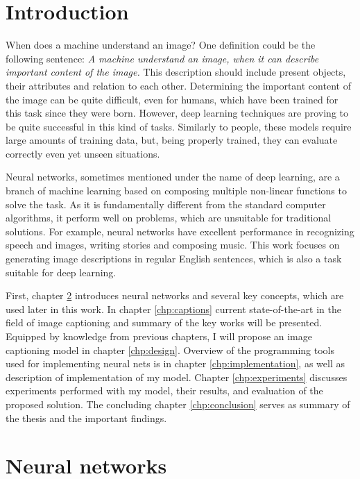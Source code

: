
\chapter{Introduction}

When does a machine understand an image? One definition could be the following sentence: \emph{A machine understand an image, when it can describe important content of the image.} This description should include present objects, their attributes and relation to each other. Determining the important content of the image can be quite difficult, even for humans, which have been trained for this task since they were born. However, deep learning techniques are proving to be quite successful in this kind of tasks. Similarly to people, these models require large amounts of training data, but, being properly trained, they can evaluate correctly even yet unseen situations.

Neural networks, sometimes mentioned under the name of deep learning, are a branch of machine learning based on composing multiple non-linear functions to solve the task. As it is fundamentally different from the standard computer algorithms, it perform well on problems, which are unsuitable for traditional solutions. For example, neural networks have excellent performance in recognizing speech and images, writing stories and composing music. This work focuses on generating image descriptions in regular English sentences, which is also a task suitable for deep learning.

First, chapter \ref{chp:nn} introduces neural networks and several key concepts, which are used later in this work. In chapter \ref{chp:captions} current state-of-the-art in the field of image captioning and summary of the key works will be presented. Equipped by knowledge from previous chapters, I will propose an image captioning model in chapter \ref{chp:design}. Overview of the programming tools used for implementing neural nets is in chapter \ref{chp:implementation}, as well as description of implementation of my model. Chapter \ref{chp:experiments} discusses experiments performed with my model, their results, and evaluation of the proposed solution. The concluding chapter \ref{chp:conclusion} serves as summary of the thesis and the important findings.

\chapter{Neural networks} \label{chp:nn}


